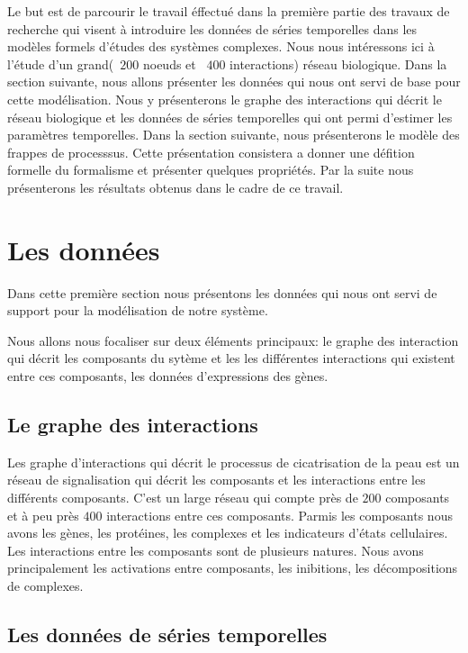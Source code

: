 \documentclass[11pt,a4paper,twoside]{epig}
\begin{document}
Le but est de parcourir le travail éffectué dans la première partie des travaux de 
recherche qui visent à introduire les données de séries temporelles dans les modèles formels d'études 
des systèmes complexes. Nous nous intéressons ici à l'étude d'un grand(~$200$ noeuds et ~$400$ interactions) réseau biologique. 
Dans la section suivante, nous allons présenter les données qui nous ont servi de base pour cette modélisation. Nous y présenterons 
le graphe des interactions qui décrit le réseau biologique et les données de séries temporelles qui ont permi d'estimer les paramètres temporelles. 
Dans la section suivante, nous présenterons le modèle des frappes de processsus. Cette présentation consistera a donner une défition formelle du 
formalisme et présenter quelques propriétés. Par la suite nous présenterons les résultats obtenus dans le cadre de ce travail. 

\vspace{3mm}
\noindent

\section{Les données}

Dans cette première section nous présentons les données qui nous ont servi de support pour la modélisation de notre système. 

Nous allons nous focaliser sur deux éléments principaux: le graphe des interaction qui décrit les composants du sytème et 
les les différentes interactions qui existent entre ces composants, les données d'expressions des gènes. 


\subsection{Le graphe des interactions}
Les graphe d'interactions qui décrit le processus de cicatrisation de la peau est un réseau de signalisation qui décrit 
les composants et les interactions entre les différents composants. C'est un large réseau qui compte près de $200$ composants 
et à peu près $400$ interactions entre ces composants. 
Parmis les composants nous avons les gènes, les protéines, les complexes et les indicateurs d'états cellulaires.
Les interactions entre les composants sont de plusieurs natures. Nous avons principalement les activations entre composants, les inibitions,
les décompositions de complexes. 


\subsection{Les données de séries temporelles}
\end{document}
